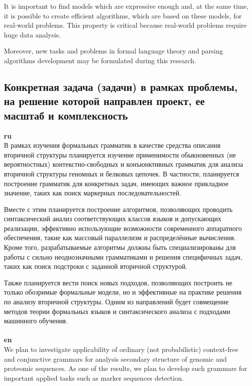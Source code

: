 \documentclass[12pt]{article}  %
\theoremstyle{remark}
\begin{document}
It is important to find models which are expressive enough and, at the same time, it is possible to create efficient algorithms, which are based on these models, for real-world problems.
This property is critical because real-world problems require huge data analysis.

Moreover, new tasks and problems in formal language theory and parsing algorithms development may be formulated during this research.


\subsection{Конкретная задача (задачи) в рамках проблемы, на решение которой направлен проект, ее масштаб и комплексность}

\textbf{ru}\\
В рамках изучения формальных грамматик в качестве средства описания вторичной структуры планируется изучение применимости обыкновенных (не вероятностных) контекстно-свободных и конъюнктивных грамматик для анализа вторичной структуры геномных и белковых цепочек.
В частности, планируется построение грамматик для конкретных задач, имеющих важное прикладное значение, таких как поиск маркерных последовательностей.

Вместе с этим планируется построение алгоритмов, позволяющих проводить синтаксический анализ соответствующих классов языков и допускающих реализации, эффективно использующие возможности современного аппаратного обеспечения, такие как массовый параллелизм и распределённые вычисления.
Кроме того, разрабатываемые алгоритмы должны быть специализированы для работы с сильно неоднозначными грамматиками и решения специфичных задач, таких как поиск подстроки с заданной вторичной структурой.

Также планируется вести поиск новых подходов, позволяющих построить не только обозримые формальные модели, но и эффективные на практике решения по анализу вторичной структуры.
Одним из направлений будет совмещение методов теории формальных языков и синтаксического анализа с подходами машинного обучения.
\\
\\
\textbf{en}\\
We plan to investigate applicability of ordinary (not probabilistic) context-free and conjunctive grammars for analysis secondary structure of genomic and proteomic sequences.
As one of the results, we plan to develop such grammars for important applied tasks such as marker sequences detection.
\end{document}
